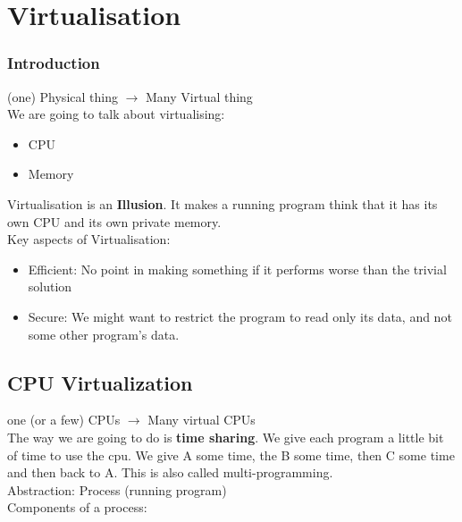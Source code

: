 \chapter{Virtualisation}

\subsection{Introduction}

(one) Physical thing $\rightarrow$ Many Virtual thing\\

We are going to talk about virtualising:

\begin{itemize}
    \item CPU
    \item Memory
\end{itemize}

Virtualisation is an \textbf{Illusion}. It makes a running program
think that it has its own CPU and its own private memory.\\

Key aspects of Virtualisation:

\begin{itemize}
    \item Efficient: No point in making something if it performs
        worse than the trivial solution
    \item Secure: We might want to restrict the program to read
        only its data, and not some other program's data.
\end{itemize}

\section{CPU Virtualization}

one (or a few) CPUs $\rightarrow$ Many virtual CPUs\\

The way we are going to do is \textbf{time sharing}. We give each
program a little bit of time to use the cpu. We give A some time, 
the B some time, then C some time and then back to A. This is also
called multi-programming.\\

Abstraction: Process (running program)\\

Components of a process:

